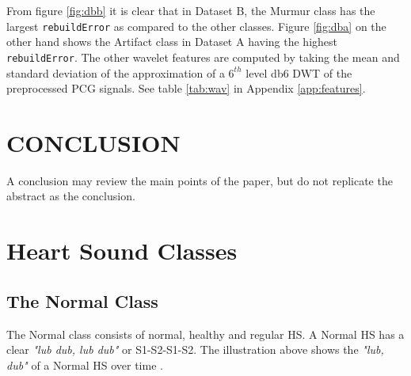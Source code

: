 \documentclass[10pt,twocolumn]{witseiepaper}
\begin{document}
From figure \ref{fig:dbb} it is clear that in Dataset B, the Murmur class has the largest \texttt{rebuildError} as compared to the other classes. Figure \ref{fig:dba} on the other hand shows the Artifact class in Dataset A having the highest \texttt{rebuildError}. The other wavelet features are computed by taking the mean and standard deviation of the approximation of a $6^{th}$ level db6 DWT of the preprocessed PCG signals. See table \ref{tab:wav} in Appendix \ref{app:features}. 
\newpage
\section{CONCLUSION}

A conclusion may review the main points of the paper, but do not replicate the
abstract as the conclusion.




%








\appendix
\section{Heart Sound Classes}
\label{HS}

\subsection*{The Normal Class}
The Normal class consists of normal, healthy and regular HS. A Normal HS has a clear \textit{"lub dub, lub dub"} or S1-S2-S1-S2. The illustration above shows the \textit{"lub, dub"} of a Normal HS over time \cite{bentley}.

\end{document}

